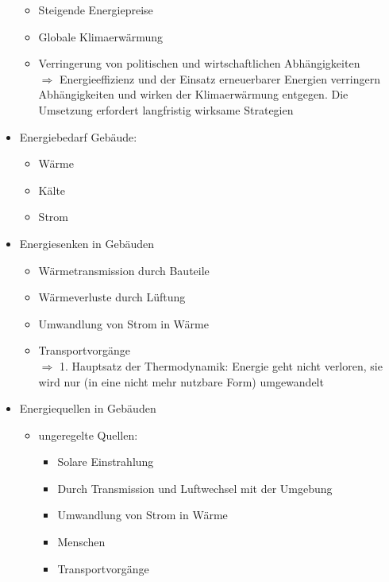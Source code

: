 \documentclass[fleqn,twoside,dvipsnames]{article}
\begin{document}
\begin{itemize}
\begin{itemize}
                    \item Steigende Energiepreise
                    \item Globale Klimaerwärmung
                    \item Verringerung von politischen und wirtschaftlichen Abhängigkeiten\\
                    $\Rightarrow$ Energieeffizienz und der Einsatz erneuerbarer Energien verringern Abhängigkeiten und wirken der Klimaerwärmung entgegen. Die Umsetzung erfordert langfristig wirksame Strategien
                \end{itemize}
            \item Energiebedarf Gebäude:
                \begin{itemize}
                    \item Wärme
                    \item Kälte
                    \item Strom
                \end{itemize}
            \item Energiesenken in Gebäuden
                \begin{itemize}
                    \item Wärmetransmission durch Bauteile
                    \item Wärmeverluste durch Lüftung
                    \item Umwandlung von Strom in Wärme
                    \item Transportvorgänge\\
                    $\Rightarrow$ 1. Hauptsatz der Thermodynamik: Energie geht nicht verloren, sie wird nur (in eine nicht mehr nutzbare Form) umgewandelt
                \end{itemize}
            \item Energiequellen in Gebäuden
                \begin{itemize}
                    \item ungeregelte Quellen:
                        \begin{itemize}
                            \item Solare Einstrahlung
                            \item Durch Transmission und Luftwechsel mit der Umgebung
                            \item Umwandlung von Strom in Wärme
                            \item Menschen
                            \item Transportvorgänge

\end{itemize}
\end{itemize}
\end{itemize}
\end{document}
